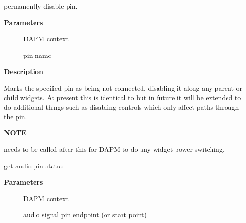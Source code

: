 \documentclass[a4paper,8pt,english]{sphinxmanual}
\begin{document}
\begin{fulllineitems}
\label{sound/kernel-api/alsa-driver-api:c.snd_soc_dapm_nc_pin}
permanently disable pin.

\end{fulllineitems}


\textbf{Parameters}
\begin{description}
\item[{}] \leavevmode
DAPM context

\item[{}] \leavevmode
pin name

\end{description}

\textbf{Description}

Marks the specified pin as being not connected, disabling it along
any parent or child widgets.  At present this is identical to
{\hyperref[sound/kernel\string-api/alsa\string-driver\string-api:c.snd_soc_dapm_disable_pin]{\emph{}}} but in future it will be extended to do
additional things such as disabling controls which only affect
paths through the pin.

\textbf{NOTE}

{\hyperref[sound/kernel\string-api/alsa\string-driver\string-api:c.snd_soc_dapm_sync]{\emph{}}} needs to be called after this for DAPM to
do any widget power switching.

\begin{fulllineitems}
\label{sound/kernel-api/alsa-driver-api:c.snd_soc_dapm_get_pin_status}
get audio pin status

\end{fulllineitems}


\textbf{Parameters}
\begin{description}
\item[{}] \leavevmode
DAPM context

\item[{}] \leavevmode
audio signal pin endpoint (or start point)

\end{description}
\end{document}
